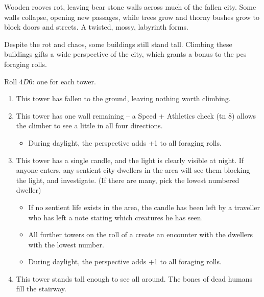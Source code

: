 \begin{multicols}{2}
\label{lostTowers}

Wooden rooves rot, leaving bear stone walls across much of the fallen city.
Some walls collapse, opening new passages, while trees grow and thorny bushes grow to block doors and streets.
A twisted, mossy, labyrinth forms.

Despite the rot and chaos, some buildings still stand tall.
Climbing these buildings gifts a wide perspective of the city, which grants a bonus to the \glspl{pc} foraging rolls.

Roll $4D6$: one for each tower.

\begin{enumerate}
  \item
  This tower has fallen to the ground, leaving nothing worth climbing.
  \item
  This tower has one wall remaining -- a Speed + Athletics check (\gls{tn} 8) allows the climber to see a little in all four directions.
  \begin{itemize}
    \item
    During daylight, the perspective adds +1 to all foraging rolls.
  \end{itemize}
  \item
  This tower has a single candle, and the light is clearly visible at night.
  If anyone enters, any sentient city-dwellers in the area will see them blocking the light, and investigate.
  (If there are many, pick the lowest numbered dweller)
  \begin{itemize}
    \item
    If no sentient life exists in the area, the candle has been left by a traveller who has left a note stating which creatures he has seen.
    \item
    All further towers on the roll of a  create an encounter with the dwellers with the lowest number.
    \item
    During daylight, the perspective adds +1 to all foraging rolls.
  \end{itemize}
  \item
  This tower stands tall enough to see all around.
  The bones of dead humans fill the stairway.


\end{enumerate}
\end{multicols}
